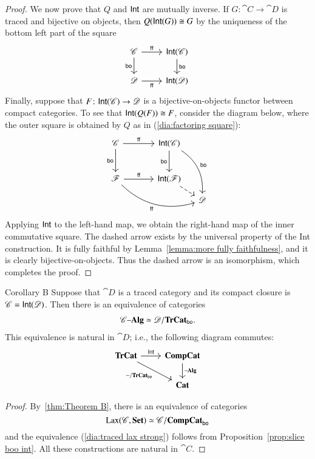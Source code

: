 \documentclass[12pt,oneside,article,draft]{memoir}
\begin{document}
\begin{proof}
	We now prove that $Q$ and $\mathsf{Int}$ are mutually inverse.
	If $G\colon\cat{C}\to\cat{D}$ is traced and bijective on objects, then $Q(\mathsf{Int}(G))\cong G$ by the uniqueness of the bottom left part of the square
	$$
	\begin{tikzcd}
	\cat{C}\arrow[r,"\ff"]\arrow[d,"\bo"']&\Int(\cat{C})\arrow[d,"\bo"]\\
	\cat{D}\arrow[r,"\ff"']&\Int(\cat{D})
	\end{tikzcd}
	$$
	Finally, suppose that $F\colon\mathsf{Int}(\mathscr{C})\to\mathscr{D}$ is a bijective-on-objects functor between compact categories.
	To see that $\mathsf{Int}(Q(F))\cong F$, consider the diagram below, where the outer square is obtained by $Q$ as in (\ref{dia:factoring square}):
	$$
	\begin{tikzcd}[column sep=small, row sep=small]
		\cat{C}\arrow[rr,"\ff"]\arrow[dd,"\bo"']
			&~
			&\Int(\cat{C})\arrow[dd,"\bo"']\arrow[dddr,bend left,"\bo"] \\
		~ \\
		\cat{F}\arrow[rr,"\ff"]\arrow[drrr,bend right, "\ff"']
			&&\Int(\cat{F})\arrow[dr,dashed] \\
		&&&\cat{D}
	\end{tikzcd}
	$$
	Applying $\mathsf{Int}$ to the left-hand map, we obtain the right-hand map of the inner commutative square.
	The dashed arrow exists by the universal property of the Int construction.
	It is fully faithful by Lemma~\ref{lemma:more fully faithfulness}, and it is clearly bijective-on-objects.
	Thus the dashed arrow is an isomorphism, which completes the proof.
\end{proof}

\begin{named}{Corollary B}\label{cor:Corollary B}
	Suppose that $\cat{D}$ is a traced category and its compact closure is $\mathscr{C}=\mathsf{Int}(\mathscr{D})$.
	Then there is an equivalence of categories
	\begin{align}\label{dia:traced lax strong}
		\mathscr{C}{\text \textendash}\mathbf{Alg}\simeq\mathscr{D}/\mathbf{TrCat}_{\mathsf{bo}}.
	\end{align}
	This equivalence is natural in $\cat{D}$; i.e., the following diagram commutes:
	\begin{equation*}
	\begin{tikzcd}
		\TrCat\ar[r,"\Fun{Int}"]\ar[dr,"-/\TrCat_{\bo}"']
			&\CompCat\ar[d,"\alg"] \\
		&\Cat{Cat}
	\end{tikzcd}
	\end{equation*}
\end{named}
\begin{proof}
	By~\ref{thm:Theorem B}, there is an equivalence of categories 
		$$\operatorname{Lax}(\mathscr{C},\mathbf{Set})\simeq\mathscr{C}/\mathbf{CompCat}_{\mathsf{bo}}$$
	and the equivalence (\ref{dia:traced lax strong}) follows from Proposition~\ref{prop:slice boo int}.
	All these constructions are natural in $\cat{C}$.
\end{proof}
\end{document}
